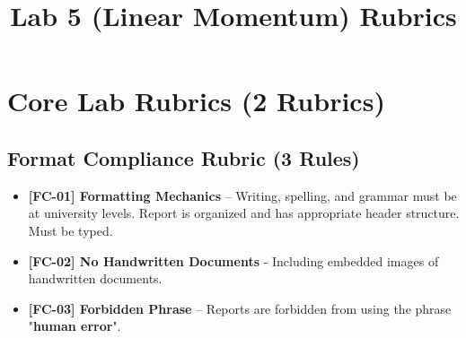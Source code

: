 \documentclass{article}
\begin{document}
\pagestyle{empty}

\title{Lab 5 (Linear Momentum) Rubrics}

\section*{Core Lab Rubrics (2 Rubrics)}

\subsection*{Format Compliance Rubric (3 Rules)}
\begin{itemize}
\item \textbf{ [FC-01] Formatting Mechanics } – Writing, spelling, and grammar must be at university levels. Report is organized and has appropriate header structure. Must be typed.
\item \textbf{ [FC-02] No Handwritten Documents } - Including embedded images of handwritten documents.
\item \textbf{ [FC-03] Forbidden Phrase } – Reports are forbidden from using the phrase "\textbf{human error}". 
\end{itemize}
\end{document}

